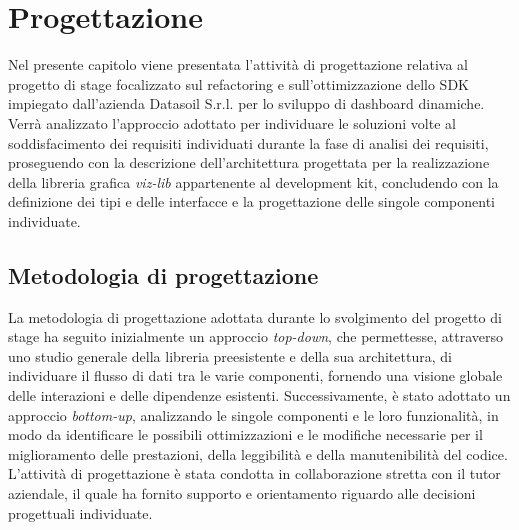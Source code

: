 \chapter{Progettazione}
\label{chap:progettazione}
Nel presente capitolo viene presentata l'attività di progettazione relativa al progetto di stage focalizzato sul refactoring e
sull'ottimizzazione dello SDK impiegato dall'azienda Datasoil S.r.l. per lo sviluppo di dashboard dinamiche.
Verrà analizzato l'approccio adottato per individuare le soluzioni volte al soddisfacimento dei requisiti individuati durante
la fase di analisi dei requisiti, proseguendo con la descrizione dell'architettura progettata per la realizzazione della libreria grafica \textit{viz-lib}
appartenente al development kit, concludendo con la definizione dei tipi e delle interfacce e la progettazione delle singole componenti individuate.

\section{Metodologia di progettazione}
La metodologia di progettazione adottata durante lo svolgimento del progetto di stage ha seguito inizialmente un approccio
\textit{top-down}, che permettesse, attraverso uno studio generale della libreria preesistente e della sua architettura, di individuare
il flusso di dati tra le varie componenti, fornendo una visione globale delle interazioni e delle dipendenze esistenti.
Successivamente, è stato adottato un approccio \textit{bottom-up}, analizzando le singole componenti e le loro funzionalità,
in modo da identificare le possibili ottimizzazioni e le modifiche necessarie per il miglioramento delle prestazioni, della leggibilità e
della manutenibilità del codice.\newline
L'attività di progettazione è stata condotta in collaborazione stretta con il tutor aziendale, il quale ha fornito supporto e orientamento
riguardo alle decisioni progettuali individuate.

